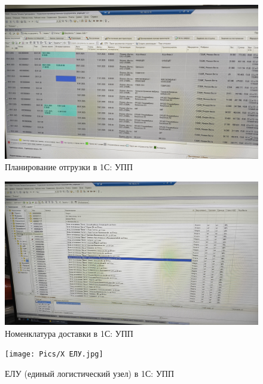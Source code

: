 \begin{figure}
\begin{center}
 \includegraphics[height=0.4\textheight, keepaspectratio]{Pics/Х планирование отгрузок.jpg}
\end{center}
 \caption{Планирование отгрузки в 1С: УПП}
 \label{pic:Х планирование отгрузок}
\end{figure}

\begin{figure}
\begin{center}
 \includegraphics[height=0.3\textheight, keepaspectratio]{Pics/Х транспорт.jpg}
\end{center}
 \caption{Номенклатура доставки в 1С: УПП}
 \label{pic:Х транспорт}
\end{figure}


\begin{figure}
\begin{center}
 \texttt{[image: Pics/Х ЕЛУ.jpg]}
\end{center}
 \caption{ЕЛУ (единый логистический узел) в 1С: УПП}
 \label{pic:Х ЕЛУ}
\end{figure}

